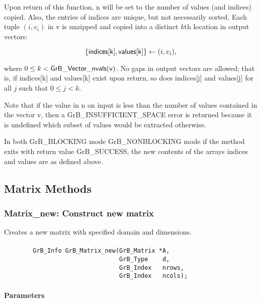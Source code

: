 Upon return of this function, {\sf n} will be set to the number of values (and 
indices) copied.  Also, the entries of {\sf indices} are unique, but not 
necessarily sorted.  Each tuple $(i,v_i)$ in {\sf v} is unzipped and copied 
into a distinct $k$th location in output vectors:

$$ \{{\sf indices[k]}, {\sf values[k]}\} \leftarrow (i,v_i),$$

where $0 \leq k < {\sf GrB\_Vector\_nvals(v)}$. No gaps in
output vectors are allowed; that is, if {\sf indices[k]} and {\sf values[k]} 
exist upon return, so does
{\sf indices[j]} and {\sf values[j]} for all $j$ such that $0 \leq j < k$.

Note that if the value in {\sf n} on input is less than the number of values
contained in the vector {\sf v}, then a {\sf GrB\_INSUFFICIENT\_SPACE} error 
is returned because it is undefined which subset of values would
be extracted otherwise.

In both {\sf GrB\_BLOCKING} mode {\sf GrB\_NONBLOCKING} mode
if the method exits with return value {\sf GrB\_SUCCESS}, the  new 
contents of the arrays {\sf indices} and {\sf values} are as defined above.  


\subsection{Matrix Methods}

\subsubsection{{\sf Matrix\_new}: Construct new matrix}

Creates a new matrix with specified domain and dimensions.

\paragraph{\syntax}

\begin{verbatim}
        GrB_Info GrB_Matrix_new(GrB_Matrix *A,
                                GrB_Type    d,
                                GrB_Index   nrows,
                                GrB_Index   ncols);
\end{verbatim}

\paragraph{Parameters}

